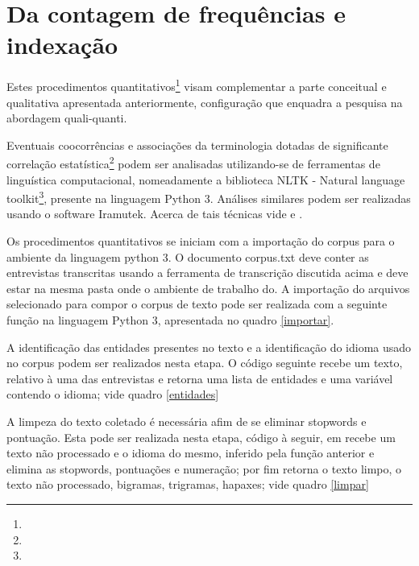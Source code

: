 \documentclass[
  12pt,       %
  openright,      %
  twoside,      %
  a4paper,      %
  english,      %
  french,       %
  spanish,      %
  brazil        %
  ]{abntex2}
\begin{document}
\section{Da contagem de frequências e indexação}

Estes procedimentos quantitativos\footnote{} visam complementar a parte conceitual e qualitativa apresentada anteriormente, configuração que enquadra a pesquisa na abordagem quali-quanti. 

Eventuais coocorrências e associações da terminologia dotadas de significante correlação estatística\footnote{} podem ser analisadas utilizando-se de ferramentas de linguística computacional, nomeadamente a biblioteca NLTK - Natural language toolkit\footnote{}, presente na linguagem Python 3.  Análises similares podem ser realizadas usando o software Iramutek. Acerca de tais técnicas vide  e .

Os procedimentos quantitativos se iniciam com a importação do corpus para o ambiente da linguagem python 3. O documento corpus.txt deve conter as entrevistas transcritas usando a ferramenta de transcrição discutida acima e deve estar na mesma pasta onde o ambiente de trabalho do. A importação do arquivos selecionado para compor o corpus de texto pode ser realizada com a seguinte função na linguagem Python 3, apresentada no quadro \ref{importar}.



\begin{quadro}[htb]
\caption{Exemplo de código em Python 3 para importar um corpus e dividi-lo em entrevistas.}

\end{quadro}


A identificação das entidades presentes no texto e a identificação do idioma usado no corpus podem ser realizados nesta etapa. O código seguinte recebe um texto, relativo à uma das entrevistas e retorna uma lista de entidades e uma variável contendo o idioma; vide quadro \ref{entidades}

\begin{quadro}[htb]
\caption{Exemplo de código em Python 3 para identificar o idioma e as entidades num texto.}

\end{quadro}


A limpeza do texto coletado é necessária afim de se eliminar stopwords e pontuação. Esta pode ser realizada nesta etapa, código à seguir, em  recebe um texto não processado e o idioma do mesmo, inferido pela função anterior e elimina as stopwords, pontuações e numeração; por fim retorna o texto limpo, o texto não processado, bigramas, trigramas, hapaxes; vide quadro \ref{limpar}
\end{document}
